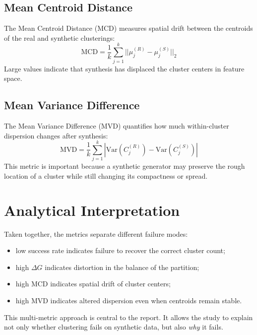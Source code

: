 \subsection{Mean Centroid Distance}
The Mean Centroid Distance (MCD) measures spatial drift between the centroids of the real and synthetic clusterings:
\begin{equation}
  \text{MCD} = \frac{1}{k} \sum_{j=1}^{k} ||\mu_j^{(R)} - \mu_j^{(S)}||_2
\end{equation}
Large values indicate that synthesis has displaced the cluster centers in feature space.

\subsection{Mean Variance Difference}
The Mean Variance Difference (MVD) quantifies how much within-cluster dispersion changes after synthesis:
\begin{equation}
  \text{MVD} = \frac{1}{k} \sum_{j=1}^{k} \left| \text{Var}(C_j^{(R)}) - \text{Var}(C_j^{(S)}) \right|
\end{equation}
This metric is important because a synthetic generator may preserve the rough location of a cluster while still changing its compactness or spread.

\section{Analytical Interpretation}
\label{sec:analytical-interpretation}

Taken together, the metrics separate different failure modes:
\begin{itemize}
  \item low success rate indicates failure to recover the correct cluster count;
  \item high $\Delta G$ indicates distortion in the balance of the partition;
  \item high MCD indicates spatial drift of cluster centers;
  \item high MVD indicates altered dispersion even when centroids remain stable.
\end{itemize}

This multi-metric approach is central to the report. It allows the study to explain not only whether clustering fails on synthetic data, but also \textit{why} it fails.
